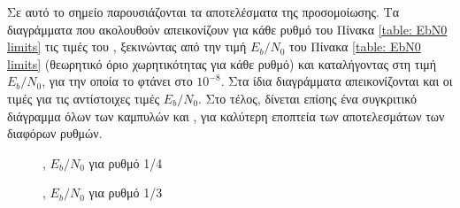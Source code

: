 Σε αυτό το σημείο παρουσιάζονται τα αποτελέσματα της προσομοίωσης. Τα διαγράμματα που ακολουθούν απεικονίζουν για κάθε ρυθμό του Πίνακα \ref{table: EbN0 limits} τις τιμές του , ξεκινώντας από την τιμή $E_b/N_0$ του Πίνακα \ref{table: EbN0 limits} (θεωρητικό όριο χωρητικότητας για κάθε ρυθμό) και καταλήγοντας στη τιμή $E_b/N_0$, για την οποία το  φτάνει στο $10^{-8}$. Στα ίδια διαγράμματα απεικονίζονται και οι τιμές  για τις αντίστοιχες τιμές $E_b/N_0$. Στο τέλος, δίνεται επίσης ένα συγκριτικό διάγραμμα όλων των καμπυλών  και , για καλύτερη εποπτεία των αποτελεσμάτων των διαφόρων ρυθμών.
\begin{figure}[H]
\caption{, $E_b/N_0$ για ρυθμό 1/4}
\end{figure}
\begin{figure}[H]
\caption{, $E_b/N_0$ για ρυθμό 1/3}
\end{figure}
